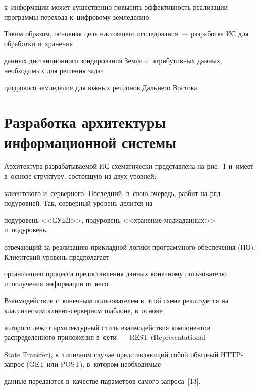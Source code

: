   к~информации может существенно повысить эф\-фек\-тив\-ность реализации программы перехода к~циф\-ро\-во\-му земледелию. 

  

  Таким образом, основная цель настоящего исследования~--- разработка ИС для обработки и~хранения 

  данных дистанционного зондирования Земли  и~атрибутивных данных, необходимых для решения задач 

  циф\-ро\-во\-го земледелия для южных регионов Дальнего Востока.

  

  \vspace*{-8pt}



\section{Разработка архитектуры информационной системы}



  \vspace*{-4pt}



  Архитектура разрабатываемой ИС схематически пред\-став\-ле\-на на рис.~1 и~имеет в~основе структуру, со\-сто\-ящую из двух уровней:

   клиентского и~серверного. Последний, в~свою очередь, разбит на ряд подуровней. Так, серверный уровень делится на 

   подуровень <<СУБД>>, подуровень <<хранение медиаданных>> и~подуровень, 

   от\-ве\-ча\-ющий за реализацию при\-клад\-ной логики программного обеспечения (ПО). Клиентский уровень предполагает 

   организацию процесса предоставления данных конечному пользователю и~получения информации от него.


  Взаимодействие с~конечным пользователем в~этой схеме реализуется на классическом кли\-ент-сер\-вер\-ном шаблоне, в~основе 

  которого лежит архитектурный стиль взаимодействия компонентов распределенного приложения в~сети~--- REST (Representational 

  State Transfer), в~типичном случае представляющий собой обычный HTTP-за\-прос (GET или POST), в~котором необходимые

   данные передаются в~качестве параметров самого запроса~[13].

